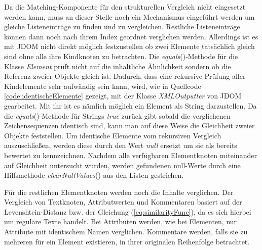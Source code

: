 Da die Matching-Komponente für den strukturellen Vergleich nicht eingesetzt werden kann, muss an dieser Stelle noch ein Mechanismus eingeführt werden um gleiche Listeneinträge zu finden und zu vergleichen. Restliche Listeneinträge können dann noch nach ihrem Index geordnet verglichen werden. Allerdings ist es mit JDOM nicht direkt möglich festzustellen ob zwei Elemente tatsächlich gleich sind ohne alle ihre Kindknoten zu betrachten. Die \emph{equals}()-Methode für die Klasse \emph{Element} prüft nicht auf die inhaltliche Ähnlichkeit sondern ob die Referenz zweier Objekte gleich ist. Dadurch, dass eine rekursive Prüfung aller Kindelemente sehr aufwändig sein kann, wird, wie in Quellcode \ref{code:identischeElemente} gezeigt, mit der Klasse \emph{XMLOutputter} von JDOM gearbeitet. Mit ihr ist es nämlich möglich ein Element als String darzustellen. Da die \emph{equals}()-Methode für Strings \emph{true} zurück gibt sobald die verglichenen Zeichensequenzen identisch sind, kann man auf diese Weise die Gleichheit zweier Objekte feststellen. Um identische Elemente vom rekursiven Vergleich auszuschließen, werden diese durch den Wert \emph{null} ersetzt um sie als bereits bewertet zu kennzeichnen. Nachdem alle verfügbaren Elementknoten miteinander auf Gleichheit untersucht wurden, werden gefundenen null-Werte durch eine Hilfsmethode \emph{clearNullValues}() aus den Listen gestrichen. 


Für die restlichen Elementknoten werden noch die Inhalte verglichen. Der Vergleich von Textknoten, Attributwerten und Kommentaren basiert auf der Levenshtein-Distanz bzw. der Gleichung (\ref{eq:similarityFunc}), da es sich hierbei um reguläre Texte handelt. Bei Attributen werden, wie bei Elementen, nur Attribute mit identischem Namen verglichen. Kommentare werden, falls sie zu mehreren für ein Element existieren, in ihrer originalen Reihenfolge betrachtet. 

